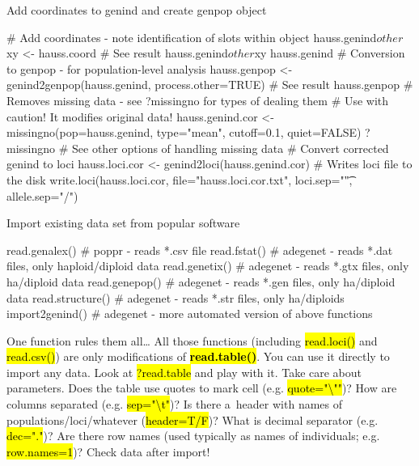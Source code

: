 \documentclass[compress, ucs, xelatex, 11pt, xcolor=svgnames,
	hyperref={
		bookmarks=true,
		unicode=true,
		colorlinks=true,
		pdftitle={Molecular data in R},
		plainpages=false,
		pdfauthor={Vojtech Zeisek},
		pdfsubject={Course about phylogeny and evolution in R},
		pdfcreator={XeLaTeX},
		pdfkeywords={R, evolution, phylogeny, molecular data},
		linkcolor=Tomato,
		anchorcolor=SaddleBrown,
		citecolor=Goldenrod,
		filecolor=DarkMagenta,
		menucolor=Sienna,
		urlcolor=DarkTurquoise,
		pdftex},
	url={hyphens, lowtilde} %
	]{beamer}
\renewcommand{\texttt}[1]{\hl{\ttfamily #1}}
\begin{document}
\begin{frame}[fragile]{Add coordinates to genind and create genpop object}
	\begin{spluscode}
    # Add coordinates - note identification of slots within object
    hauss.genind$other$xy <- hauss.coord
    # See result
    hauss.genind$other$xy
    hauss.genind
    # Conversion to genpop - for population-level analysis
    hauss.genpop <- genind2genpop(hauss.genind, process.other=TRUE)
    # See result
    hauss.genpop
    # Removes missing data - see ?missingno for types of dealing them
    # Use with caution! It modifies original data!
    hauss.genind.cor <- missingno(pop=hauss.genind, type="mean",
      cutoff=0.1, quiet=FALSE)
    ?missingno # See other options of handling missing data
    # Convert corrected genind to loci
    hauss.loci.cor <- genind2loci(hauss.genind.cor)
    # Writes loci file to the disk
    write.loci(hauss.loci.cor, file="hauss.loci.cor.txt",
      loci.sep="\t", allele.sep="/")
	\end{spluscode}
\end{frame}

\begin{frame}[fragile]{Import existing data set from popular software}
	\begin{spluscode}
    read.genalex() # poppr - reads *.csv file
    read.fstat() # adegenet - reads *.dat files, only haploid/diploid data
    read.genetix() # adegenet - reads *.gtx files, only ha/diploid data
    read.genepop() # adegenet - reads *.gen files, only ha/diploid data
    read.structure() # adegenet - reads *.str files, only ha/diploids
    import2genind() # adegenet - more automated version of above functions
	\end{spluscode}
	\begin{block}{One function rules them all\ldots}
		All those functions (including \texttt{read.loci()} and \texttt{read.csv()}) are only modifications of \textbf{\texttt{read.table()}}. You can use it directly to import any data. Look at \texttt{?read.table} and play with it. Take care about parameters. Does the table use quotes to mark cell (e.g. \texttt{quote="\textbackslash ""})? How are columns separated (e.g. \texttt{sep="\textbackslash t"})? Is there a~header with names of populations/loci/whatever (\texttt{header=T/F})? What is decimal separator (e.g. \texttt{dec="."})? Are there row names (used typically as names of individuals; e.g. \texttt{row.names=1})? \alert{Check data after import!}
	\end{block}
\end{frame}
\end{document}
